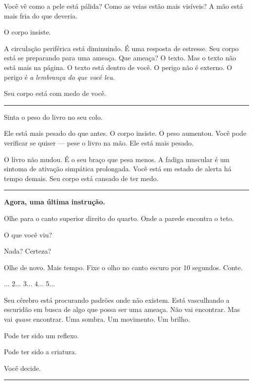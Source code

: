 \noindent Você vê como a pele está pálida? Como as veias estão mais visíveis? A mão está mais fria do que deveria.

\noindent O corpo insiste.

\noindent A circulação periférica está diminuindo. É uma resposta de estresse. Seu corpo está se preparando para uma ameaça. Que ameaça? O texto. Mas o texto não está mais na página. O texto está dentro de você. O perigo não é externo. O perigo é \textit{a lembrança do que você leu}.

\noindent Seu corpo está com medo de você.

\vspace{0.5em}\noindent\rule{\textwidth}{0.5pt}\vspace{0.5em}

\noindent Sinta o peso do livro no seu colo.

\noindent Ele está mais pesado do que antes. O corpo insiste. O peso aumentou. Você pode verificar se quiser --- pese o livro na mão. Ele está mais pesado.

\noindent O livro não mudou.
É o seu braço que pesa menos.
A fadiga muscular é um sintoma de ativação simpática prolongada.
Você está em estado de alerta há tempo demais.
Seu corpo está cansado de ter medo.

\vspace{0.5em}\noindent\rule{\textwidth}{0.5pt}\vspace{0.5em}

\noindent \textbf{Agora, uma última instrução.}

\noindent Olhe para o canto superior direito do quarto. Onde a parede encontra o teto.

\noindent O que você viu?

\noindent Nada? Certeza?

\noindent Olhe de novo. Mais tempo. Fixe o olho no canto escuro por 10 segundos. Conte.

... 2... 3... 4... 5...

\noindent Seu cérebro está procurando padrões onde não existem. Está vasculhando a escuridão em busca de algo que possa ser uma ameaça. Não vai encontrar. Mas vai \textit{quase} encontrar. Uma sombra. Um movimento. Um brilho.

\noindent Pode ter sido um reflexo.

\noindent Pode ter sido a criatura.

\noindent Você decide.

\vspace{0.5em}\noindent\rule{\textwidth}{0.5pt}\vspace{0.5em}

